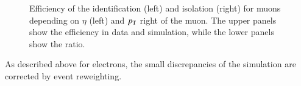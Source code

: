 \begin{figure}[htbp!]
  \begin{center}
\caption{Efficiency of the identification (left) and isolation (right) for muons depending on $\eta$ (left) and $p_{\mathrm{T}}$ right of the muon.
         The upper panels show the efficiency in data and simulation, while the lower panels show the ratio.
  \label{fig:reco_mueff}}
  \end{center}
\end{figure}

As described above for electrons, the small discrepancies of the simulation are corrected by event reweighting.

